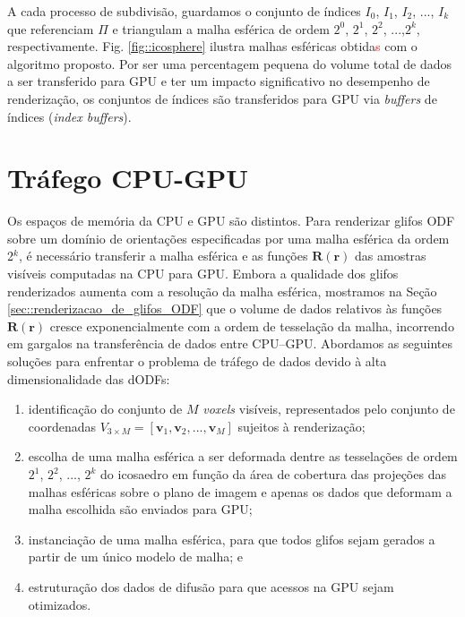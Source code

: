 A cada processo de subdivisão, guardamos o conjunto de índices $I_0$, $I_1$, $I_2$, ..., $I_k$ que referenciam $\Pi$ e triangulam a malha esférica de ordem $2^0$, $2^1$, $2^2$, ...,$2^k$, respectivamente. Fig. \ref{fig::icosphere} ilustra malhas esféricas obtida\textcolor{red}{s} com o algoritmo proposto. Por ser uma percentagem pequena do volume total de dados a ser transferido para GPU e ter um impacto significativo no desempenho de renderização, os conjuntos de índices são transferidos para GPU via \textit{buffers} de índices (\textit{index buffers}).
\section{Tráfego CPU-GPU}
\label{sec::trafego_cpu_gpu}

Os espaços de memória da CPU e GPU são distintos. Para renderizar glifos ODF sobre um domínio de orientações especificadas por uma malha esférica da ordem 2$^k$, é necessário transferir a malha esférica e as funções  $\mathbf{R}(\mathbf{r})$ das amostras visíveis computadas na CPU para GPU. Embora a qualidade dos glifos renderizados aumenta com a resolução da malha esférica, mostramos na Seção \ref{sec::renderizacao_de_glifos_ODF} que o volume de dados relativos às funções $\mathbf{R}(\mathbf{r})$ cresce exponencialmente com a ordem de tesselação da malha, incorrendo em gargalos na transferência de dados entre CPU--GPU. Abordamos as seguintes soluções para enfrentar o problema de tráfego de dados devido à alta dimensionalidade das dODFs:

\begin{enumerate}
    \item identificação do conjunto de $M$ \textit{voxels} visíveis, representados pelo conjunto de coordenadas $V_{3 \times M} = [
\mathbf{v}_1,
\mathbf{v}_2, ..., 
\mathbf{v}_M
]$ sujeitos à renderização;
\item escolha de uma malha esférica a ser deformada dentre as tesselações de ordem $2^1$, $2^2$, ..., $2^k$ do icosaedro em função da área de cobertura das projeções das malhas esféricas sobre o plano de imagem e apenas os dados que deformam a malha escolhida são enviados para GPU;
\item instanciação de uma malha esférica, para que todos glifos sejam gerados a partir de um único modelo de malha; e
\item estruturação dos dados de difusão para que acessos na GPU sejam otimizados.
\end{enumerate}


